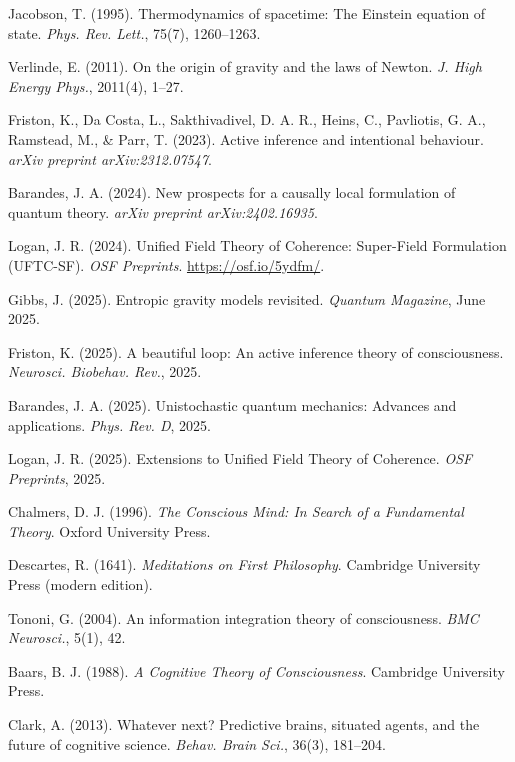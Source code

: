 \documentclass[12pt]{book}
\theoremstyle{definition}
\begin{document}

\begin{thebibliography}{10}

Jacobson, T. (1995).
Thermodynamics of spacetime: The Einstein equation of state.
\emph{Phys. Rev. Lett.}, 75(7), 1260--1263.

Verlinde, E. (2011).
On the origin of gravity and the laws of Newton.
\emph{J. High Energy Phys.}, 2011(4), 1--27.

Friston, K., Da Costa, L., Sakthivadivel, D. A. R., Heins, C., Pavliotis, G. A., Ramstead, M., \& Parr, T. (2023).
Active inference and intentional behaviour.
\emph{arXiv preprint arXiv:2312.07547}.

Barandes, J. A. (2024).
New prospects for a causally local formulation of quantum theory.
\emph{arXiv preprint arXiv:2402.16935}.

Logan, J. R. (2024).
Unified Field Theory of Coherence: Super-Field Formulation (UFTC-SF).
\emph{OSF Preprints}.
\url{https://osf.io/5ydfm/}.

Gibbs, J. (2025).
Entropic gravity models revisited.
\emph{Quantum Magazine}, June 2025.

Friston, K. (2025).
A beautiful loop: An active inference theory of consciousness.
\emph{Neurosci. Biobehav. Rev.}, 2025.

Barandes, J. A. (2025).
Unistochastic quantum mechanics: Advances and applications.
\emph{Phys. Rev. D}, 2025.

Logan, J. R. (2025).
Extensions to Unified Field Theory of Coherence.
\emph{OSF Preprints}, 2025.

Chalmers, D. J. (1996).
\emph{The Conscious Mind: In Search of a Fundamental Theory}.
Oxford University Press.

Descartes, R. (1641).
\emph{Meditations on First Philosophy}.
Cambridge University Press (modern edition).

Tononi, G. (2004).
An information integration theory of consciousness.
\emph{BMC Neurosci.}, 5(1), 42.

Baars, B. J. (1988).
\emph{A Cognitive Theory of Consciousness}.
Cambridge University Press.

Clark, A. (2013).
Whatever next? Predictive brains, situated agents, and the future of cognitive science.
\emph{Behav. Brain Sci.}, 36(3), 181--204.

\end{thebibliography}
\end{document}
